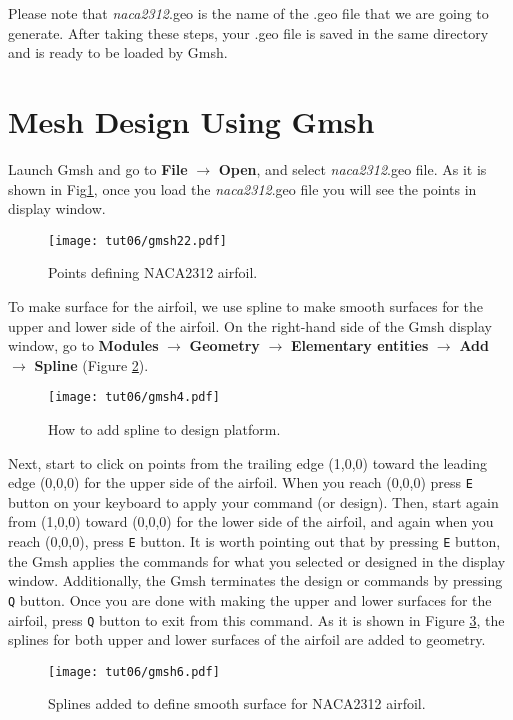 Please note that \textit{naca2312}.geo is the name of the .geo file that we are going to generate. After taking these steps, your .geo file is saved in the same directory and is ready to be loaded by Gmsh.
\section{Mesh Design Using Gmsh}
Launch Gmsh and go to \textbf{File} $\rightarrow$ \textbf{Open}, and select \textit{naca2312}.geo file. As it is shown in Fig\ref{fig6:gmsh22}, once you load the \textit{naca2312}.geo file you will see the points in display window.
\begin{figure}[htbp]
    \centering
    \texttt{[image: tut06/gmsh22.pdf]}
    \caption{Points defining NACA2312 airfoil.}
    \label{fig6:gmsh22}
\end{figure}
To make surface for the airfoil, we use spline to make smooth surfaces for the upper and lower side of the airfoil. On the right-hand side of the Gmsh display window, go to \textbf{Modules} $\rightarrow$ \textbf{Geometry} $\rightarrow$ \textbf{Elementary entities} $\rightarrow$ \textbf{Add} $\rightarrow$ \textbf{Spline} (Figure \ref{fig6:gmsh4}).
\begin{figure}[htbp]
    \centering
    \texttt{[image: tut06/gmsh4.pdf]}
    \caption{How to add spline to design platform.}
    \label{fig6:gmsh4}
\end{figure}
Next, start to click on points from the trailing edge (1,0,0) toward the leading edge (0,0,0) for the upper side of the airfoil. When you reach (0,0,0) press \texttt{E} button on your keyboard to apply your command (or design). Then, start again from (1,0,0) toward (0,0,0) for the lower side of the airfoil, and again when you reach (0,0,0), press \texttt{E} button. It is worth pointing out that by pressing \texttt{E} button, the Gmsh applies the commands for what you selected or designed in the display window. Additionally, the Gmsh terminates the design or commands by pressing \texttt{Q} button. Once you are done with making the upper and lower surfaces for the airfoil, press \texttt{Q} button to exit from this command. As it is shown in Figure \ref{fig6:gmsh6}, the splines for both upper and lower surfaces of the airfoil are added to geometry.
\begin{figure}[htbp]
    \centering
    \texttt{[image: tut06/gmsh6.pdf]}
    \caption{Splines added to define smooth surface for NACA2312 airfoil.}
    \label{fig6:gmsh6}
\end{figure}
